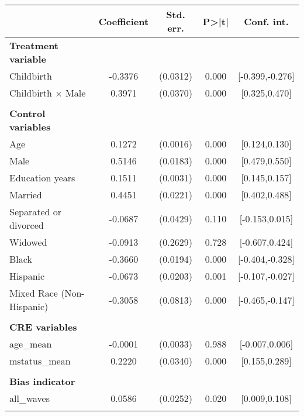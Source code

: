 {
\def\sym#1{\ifmmode^{#1}\else\(^{#1}\)\fi}
\begin{tabular}{l*{1}{cccc}}
\toprule
                    & Coefficient&   Std. err.&       P>|t|&  Conf. int.\\
\midrule
\textbf{Treatment variable}&            &            &            &            \\
Childbirth          &     -0.3376&    (0.0312)&       0.000&[-0.399,-0.276]\\
Childbirth $\times$ Male&      0.3971&    (0.0370)&       0.000&[0.325,0.470]\\
\\ \textbf{Control variables}&            &            &            &            \\
Age                 &      0.1272&    (0.0016)&       0.000&[0.124,0.130]\\
Male                &      0.5146&    (0.0183)&       0.000&[0.479,0.550]\\
Education years     &      0.1511&    (0.0031)&       0.000&[0.145,0.157]\\
Married             &      0.4451&    (0.0221)&       0.000&[0.402,0.488]\\
Separated or divorced&     -0.0687&    (0.0429)&       0.110&[-0.153,0.015]\\
Widowed             &     -0.0913&    (0.2629)&       0.728&[-0.607,0.424]\\
Black               &     -0.3660&    (0.0194)&       0.000&[-0.404,-0.328]\\
Hispanic            &     -0.0673&    (0.0203)&       0.001&[-0.107,-0.027]\\
Mixed Race (Non-Hispanic)&     -0.3058&    (0.0813)&       0.000&[-0.465,-0.147]\\
\\ \textbf{CRE variables}&            &            &            &            \\
age\_mean            &     -0.0001&    (0.0033)&       0.988&[-0.007,0.006]\\
mstatus\_mean        &      0.2220&    (0.0340)&       0.000&[0.155,0.289]\\
\\ \textbf{Bias indicator}&            &            &            &            \\
all\_waves           &      0.0586&    (0.0252)&       0.020&[0.009,0.108]\\
                    &            &            &            &            \\

\end{tabular}}
